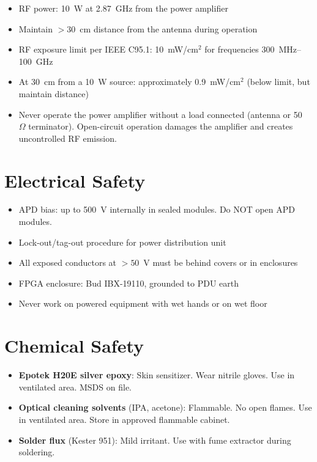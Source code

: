 \documentclass[11pt,a4paper,openany]{book}
\begin{document}
\begin{itemize}[nosep]
  \item RF power: 10~W at 2.87~GHz from the power amplifier
  \item Maintain $> 30$~cm distance from the antenna during operation
  \item RF exposure limit per IEEE C95.1: 10~mW/cm$^2$ for frequencies 300~MHz--100~GHz
  \item At 30~cm from a 10~W source: approximately 0.9~mW/cm$^2$ (below limit, but maintain distance)
  \item Never operate the power amplifier without a load connected (antenna or 50~$\Omega$ terminator). Open-circuit operation damages the amplifier and creates uncontrolled RF emission.
\end{itemize}

\section{Electrical Safety}

\begin{itemize}[nosep]
  \item APD bias: up to 500~V internally in sealed modules. Do NOT open APD modules.
  \item Lock-out/tag-out procedure for power distribution unit
  \item All exposed conductors at $> 50$~V must be behind covers or in enclosures
  \item FPGA enclosure: Bud IBX-19110, grounded to PDU earth
  \item Never work on powered equipment with wet hands or on wet floor
\end{itemize}

\section{Chemical Safety}

\begin{itemize}[nosep]
  \item \textbf{Epotek H20E silver epoxy}: Skin sensitizer. Wear nitrile gloves. Use in ventilated area. MSDS on file.
  \item \textbf{Optical cleaning solvents} (IPA, acetone): Flammable. No open flames. Use in ventilated area. Store in approved flammable cabinet.
  \item \textbf{Solder flux} (Kester 951): Mild irritant. Use with fume extractor during soldering.
\end{itemize}
\end{document}
